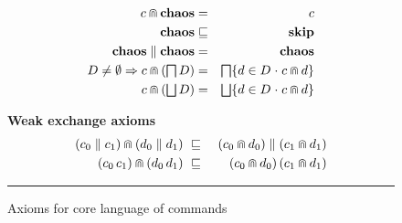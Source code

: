 \documentclass[fleqn]{fac}
\newcommand{\figurerule}{\rule{\textwidth}{0.5pt}}
\newcommand{\labelaxiom}[1]{\label{axiom-#1}\index{Axiom!#1|AxiomDef{\ref{axiom-#1}}}}
\newcommand{\SSeq}{\,}
\newcommand{\Nondet}{\mathop{\textstyle\bigsqcap}}
\newcommand{\Angelic}{\mathop{\textstyle\bigsqcup}}
\newcommand{\together}{\mathbin{\doublecap}}
\newcommand{\Keyword}[1]{\mathsf{\mathbf{#1}}}
\newcommand{\Chaos}{\Keyword{chaos}}
\newcommand{\Skip}{\Keyword{skip}}
\begin{document}
\begin{figure}
\begin{minipage}{0.48\textwidth}
\begin{eqnarray}
  c \together \Chaos & = & c  \labelaxiom{conjunction-identity} \\
  \Chaos & \refsto & \Skip  \labelaxiom{chaos-skip} \\
  \Chaos \parallel \Chaos & = & \Chaos  \labelaxiom{chaos-parallel-chaos} \\
  D \neq \emptyset \implies c \together (\Nondet D) & = & \Nondet \{ d \in D \spot c \together d \} \labelaxiom{conjunction-distribute-infimum} \\
  c \together (\Angelic D) & = & \Angelic \{ d \in D \spot c \together d \} \labelaxiom{conjunction-distribute-supremum}
\end{eqnarray}
\end{minipage}
\begin{center}
\begin{minipage}{0.6\textwidth}
\textbf{Weak exchange axioms}
\begin{eqnarray}
  (c_0 \parallel c_1) \together (d_0 \parallel d_1) & ~\refsto~ & (c_0 \together d_0) \parallel (c_1 \together d_1) 
    \labelaxiom{conjunction-exchange-parallel} \\
  (c_0 \SSeq c_1) \together (d_0 \SSeq d_1) & ~\refsto~ & (c_0 \together d_0) \SSeq (c_1 \together d_1) 
    \labelaxiom{conjunction-exchange-sequential}
\end{eqnarray}
\end{minipage}
\end{center}
\figurerule

\caption{Axioms for core language of commands}\label{figure:axioms}
\end{figure}
\end{document}
